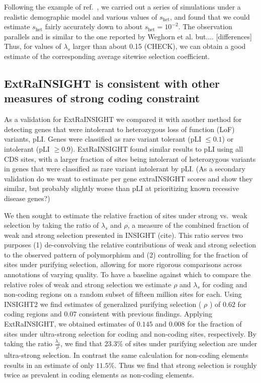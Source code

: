 \documentclass[11pt]{article}
\begin{document}
Following the example of ref.\ \cite{WEGHETAL19}, we carried out a series of simulations 
under a realistic demographic model  and various values of $s_{\text{het}}$, 
and found that we could estimate $s_{\text{het}}$ fairly accurately down to about $s_{\text{het}} = 10^{-2}$.
The observation parallels and is similar to the one reported by Weghorn et al. but.... [differences]
Thus, for values of $\lambda_s$ larger than about 0.15 (CHECK), we can obtain a good estimate of the corresponding average sitewise selection coefficient.

\subsection*{ExtRaINSIGHT is consistent with other measures of strong coding constraint}
As a validation for ExtRaINSIGHT we compared it with another method for detecting genes that were intolerant to heterozygous loss of function (LoF) variants, pLI. Genes were classified as rare variant tolerant (pLI $\leq 0.1$) or intolerant (pLI $\geq 0.9$). ExtRaINSIGHT found similar results to pLI using all CDS sites, with a larger fraction of sites being intolerant of heterozygous variants in genes that were classified as rare variant intolerant by pLI.  (As a secondary validation do we want to estimate per gene extraINSIGHT scores and show they similar, but probably slightly worse than pLI at prioritizing known recessive disease genes?) 

We then sought to estimate the relative fraction of sites under strong vs.\ weak selection by taking the ratio of $\lambda_s$ and $\rho$, a measure of the combined fraction of weak and strong selection presented in INSIGHT (cite). This ratio serves two purposes (1) de-convolving the relative contributions of weak and strong selection to the observed pattern of polymorphism and (2) controlling for the fraction of sites under purifying selection, allowing for more rigorous comparisons across annotations of varying quality. To have a baseline against which to compare the relative roles of weak and strong selection we estimate $\rho$ and $\lambda_s$ for coding and non-coding regions on a random subset of fifteen million sites for each. Using INSIGHT2 we find estimates of generalized purifying selection ( $\rho$ ) of $0.62$ for coding regions and $0.07$ consistent with previous findings. Applying ExtRaINSIGHT, we obtained estimates of $0.145$ and $0.008$ for the fraction of sites under ultra-strong selection for coding and non-coding sites, respectively. By taking the ratio $\frac{\lambda_s}{\rho}$, we find that $23.3\%$ of sites under purifying selection are under ultra-strong selection. In contrast the same calculation for non-coding elements results in an estimate of only $11.5\%$. Thus we find that strong selection is roughly twice as prevalent in coding elements as non-coding elements.
\end{document}
